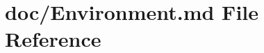 \hypertarget{Environment_8md}{\section{doc/\-Environment.md File Reference}
\label{Environment_8md}
}
